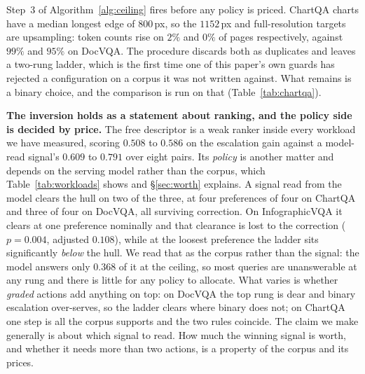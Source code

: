 \documentclass[10pt,twocolumn]{article}
\theoremstyle{plain}
\begin{document}
Step~3 of Algorithm~\ref{alg:ceiling} fires before any policy is priced. ChartQA charts have a
median longest edge of $800$\,px, so the $1152$\,px and full-resolution targets
are upsampling: token counts rise on $2\%$ and $0\%$ of pages respectively,
against $99\%$ and $95\%$ on DocVQA. The procedure discards both as duplicates
and leaves a two-rung ladder, which is the first time one of this paper's own
guards has rejected a configuration on a corpus it was not written against.
What remains is a binary choice, and the comparison is run on that
(Table~\ref{tab:chartqa}).

\begin{table}[t]
\centering\small
\setlength{\tabcolsep}{4pt}
\caption{The surviving rung on $500$ ChartQA questions, $30$ resampled folds,
per-example prices. Every entropy interval excludes zero. The ladder and the
binary rule coincide here to within $0.002$, because Algorithm~\ref{alg:ceiling} left only one
rung for either to choose.}
\label{tab:chartqa}
\end{table}

\textbf{The inversion holds as a statement about ranking, and the policy side
is decided by price.} The free descriptor is a weak ranker inside every
workload we have measured, scoring $0.508$ to $0.586$ on the escalation gain
against a model-read signal's $0.609$ to $0.791$ over eight pairs. Its \emph{policy} is another
matter and depends on the serving model rather than the corpus, which
Table~\ref{tab:workloads} shows and \S\ref{sec:worth} explains. A signal read from the model clears the hull on two of the
three, at four preferences of four on ChartQA and three of four on DocVQA, all
surviving correction. On InfographicVQA it clears at one preference nominally
and that clearance is lost to the correction ($p = 0.004$, adjusted $0.108$),
while at the loosest preference the ladder sits significantly \emph{below} the
hull. We read that as the corpus rather than the signal: the model answers only
$0.368$ of it at the ceiling, so most queries are unanswerable at any rung and
there is little for any policy to allocate.
What varies is whether \emph{graded} actions add anything on top: on DocVQA the
top rung is dear and binary escalation over-serves, so the ladder clears where
binary does not; on ChartQA one step is all the corpus supports and the two
rules coincide. The claim we make generally is about which signal to read. How
much the winning signal is worth, and whether it needs more than two actions,
is a property of the corpus and its prices.
\end{document}
